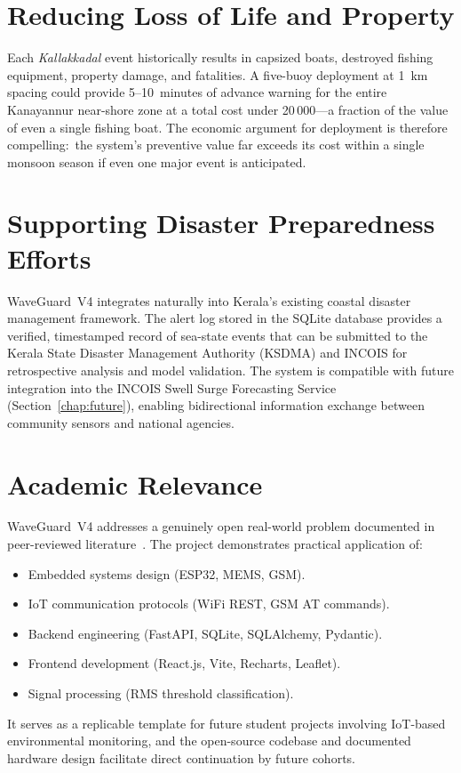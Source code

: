 \section{Reducing Loss of Life and Property}

Each \textit{Kallakkadal} event historically results in capsized boats, destroyed
fishing equipment, property damage, and fatalities.
A five-buoy deployment at 1~km spacing could provide 5--10~minutes of advance warning
for the entire Kanayannur near-shore zone at a total cost under \INR{}20\,000---a
fraction of the value of even a single fishing boat.
The economic argument for deployment is therefore compelling:\ the system's preventive
value far exceeds its cost within a single monsoon season if even one major event is
anticipated.

\section{Supporting Disaster Preparedness Efforts}

WaveGuard~V4 integrates naturally into Kerala's existing coastal disaster management
framework.
The alert log stored in the SQLite database provides a verified, timestamped record
of sea-state events that can be submitted to the Kerala State Disaster Management
Authority (KSDMA) and INCOIS for retrospective analysis and model validation.
The system is compatible with future integration into the INCOIS Swell Surge
Forecasting Service (Section~\ref{chap:future}), enabling bidirectional information
exchange between community sensors and national agencies.

\section{Academic Relevance}

WaveGuard~V4 addresses a genuinely open real-world problem documented in peer-reviewed
literature~\cite{incois2024kallakkadal, remya2016teleconnection, nair2018coastal}.
The project demonstrates practical application of:
\begin{itemize}
  \item Embedded systems design (ESP32, MEMS, GSM).
  \item IoT communication protocols (WiFi REST, GSM AT commands).
  \item Backend engineering (FastAPI, SQLite, SQLAlchemy, Pydantic).
  \item Frontend development (React.js, Vite, Recharts, Leaflet).
  \item Signal processing (RMS threshold classification).
\end{itemize}
It serves as a replicable template for future student projects involving IoT-based
environmental monitoring, and the open-source codebase and documented hardware design
facilitate direct continuation by future cohorts.

